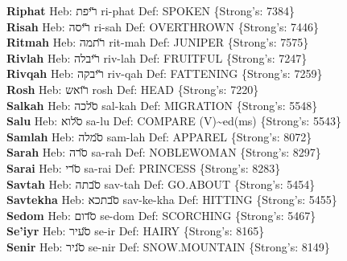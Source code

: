 {\textbf{Riphat} Heb: {\large\H ריפת} ri-phat Def: SPOKEN \{Strong's: 7384\}\hfill{}\\

\textbf{Risah} Heb: {\large\H ריסה} ri-sah Def: OVERTHROWN \{Strong's: 7446\}\hfill{}\\

\textbf{Ritmah} Heb: {\large\H רתמה} rit-mah Def: JUNIPER \{Strong's: 7575\}\hfill{}\\

\textbf{Rivlah} Heb: {\large\H ריבלה} riv-lah Def: FRUITFUL \{Strong's: 7247\}\hfill{}\\

\textbf{Rivqah} Heb: {\large\H ריבקה} riv-qah Def: FATTENING \{Strong's: 7259\}\hfill{}\\

\textbf{Rosh} Heb: {\large\H רואש} rosh Def: HEAD \{Strong's: 7220\}\hfill{}\\

\textbf{Salkah} Heb: {\large\H סלכה} sal-kah Def: MIGRATION \{Strong's: 5548\}\hfill{}\\

\textbf{Salu} Heb: {\large\H סלוא} sa-lu Def: COMPARE (V)\textasciitilde{}ed(ms) \{Strong's: 5543\}\hfill{}\\

\textbf{Samlah} Heb: {\large\H סמלה} sam-lah Def: APPAREL \{Strong's: 8072\}\hfill{}\\

\textbf{Sarah} Heb: {\large\H סרה} sa-rah Def: NOBLEWOMAN \{Strong's: 8297\}\hfill{}\\

\textbf{Sarai} Heb: {\large\H סרי} sa-rai Def: PRINCESS \{Strong's: 8283\}\hfill{}\\

\textbf{Savtah} Heb: {\large\H סבתה} sav-tah Def: GO.ABOUT \{Strong's: 5454\}\hfill{}\\

\textbf{Savtekha} Heb: {\large\H סבתכא} sav-ke-kha Def: HITTING \{Strong's: 5455\}\hfill{}\\

\textbf{Sedom} Heb: {\large\H סדום} se-dom Def: SCORCHING \{Strong's: 5467\}\hfill{}\\

\textbf{Se'iyr} Heb: {\large\H סעיר} se-ir Def: HAIRY \{Strong's: 8165\}\hfill{}\\

\textbf{Senir} Heb: {\large\H סניר} se-nir Def: SNOW.MOUNTAIN \{Strong's: 8149\}\hfill{}\\

}
